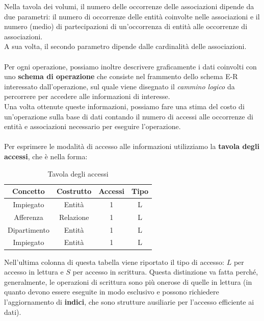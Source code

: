 Nella tavola dei volumi, il numero delle occorrenze delle associazioni dipende da due parametri: il numero di occorrenze delle entità coinvolte nelle associazioni e il numero (medio) di partecipazioni di un'occorrenza di entità alle occorrenze di associazioni.\\
A sua volta, il secondo parametro dipende dalle cardinalità delle associazioni.\\\\ 
Per ogni operazione, possiamo inoltre descrivere graficamente i dati coinvolti con uno \textbf{schema di operazione} che consiste nel frammento dello schema E-R interessato dall'operazione, sul quale viene disegnato il \textit{cammino logico} da percorrere per accedere alle informazioni di interesse.\\
Una volta ottenute queste informazioni, possiamo fare una stima del costo di un'operazione sulla base di dati contando il numero di accessi alle occorrenze di entità e associazioni necessario per eseguire l'operazione.\\\\
Per esprimere le modalità di accesso alle informazioni utilizziamo la \textbf{tavola degli accessi}, che è nella forma:
    \begin{table}\caption{Tavola degli accessi}
        \begin{center}\begin{tabular}{|c|c|c|c|} \hline
        \textbf{Concetto} & \textbf{Costrutto} & \textbf{Accessi} & \textbf{Tipo} \\ \hline
        Impiegato & Entità & 1 & L \\ \hline
        Afferenza & Relazione & 1 & L \\ \hline
        Dipartimento & Entità & 1 & L \\ \hline
        Impiegato & Entità & 1 & L \\ \hline
        \end{tabular}\end{center}
    \end{table}
Nell'ultima colonna di questa tabella viene riportato il tipo di accesso: $L$ per accesso in lettura e $S$ per accesso in scrittura. Questa distinzione va fatta perché, generalmente, le operazioni di scrittura sono più onerose di quelle in lettura (in quanto devono essere eseguite in modo esclusivo e possono richiedere l'aggiornamento di \textbf{indici}, che sono strutture ausiliarie per l'accesso efficiente ai dati).



